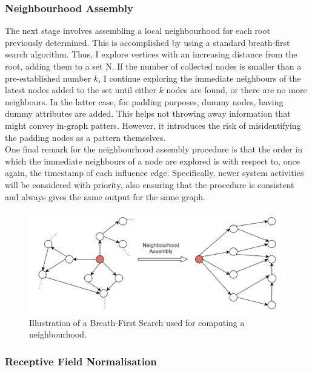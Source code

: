 \subsubsection*{Neighbourhood Assembly}

The next stage involves assembling a local neighbourhood for each root previously determined. This is accomplished by using a standard breath-first search algorithm. Thus, I explore vertices with an increasing distance from the root, adding them to a set N. If the number of collected nodes is smaller than a pre-established number $k$, I continue exploring the immediate neighbours of the latest nodes added to the set until either $k$ nodes are found, or there are no more neighbours. In the latter case, for padding purposes, dummy nodes, having dummy attributes are added. This helps not throwing away information that might convey in-graph patters. However, it introduces the risk of misidentifying the padding nodes as a pattern themselves. \\

One final remark for the neighbourhood assembly procedure is that the order in which the immediate neighbours of a node are explored is with respect to, once again, the timestamp of each influence edge. Specifically, newer system activities will be considered with priority, also ensuring that the procedure is consistent and always gives the same output for the same graph. 

\begin{figure}[H]
  \centering
  \includegraphics[scale=0.275]{Images/neighassemb2.png}
  \caption{Illustration of a Breath-First Search used for computing a neighbourhood.}
  \label{neighassemb}
\end{figure}


\subsubsection*{Receptive Field Normalisation}

